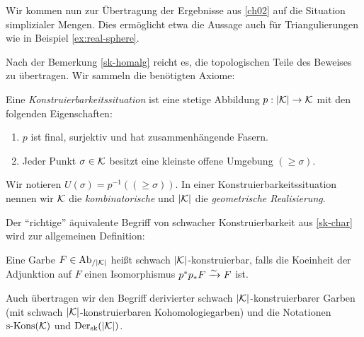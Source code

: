 Wir kommen nun zur Übertragung der Ergebnisse aus \ref{ch02} auf die
Situation simplizialer Mengen. Dies ermöglicht etwa die Aussage auch
für Triangulierungen wie in Beispiel \ref{ex:real-sphere}.

Nach der Bemerkung \ref{sk-homalg} reicht es, die topologischen Teile
des Beweises zu übertragen. Wir sammeln die benötigten Axiome:
\begin{defn} \label{def:constr}
  Eine \emph{Konstruierbarkeitssituation} ist eine stetige Abbildung
  $p: |\mathcal{K}| \to \mathcal{K}$ mit den folgenden Eigenschaften:
  \begin{enumerate}
  \item \label{constr-final} $p$ ist final, surjektiv und hat
    zusammenhängende Fasern.
  \item \label{constr-comb-space} Jeder Punkt $\sigma \in \mathcal{K}$ besitzt
    eine kleinste offene Umgebung $(\geq \sigma)$.
  \end{enumerate}
\end{defn}
Wir notieren $U(\sigma) = p^{-1}((\geq \sigma))$. In einer
Konstruierbarkeitssituation nennen wir $\mathcal{K}$ die \emph{kombinatorische}
und $|\mathcal{K}|$ die \emph{geometrische Realisierung}.

Der ``richtige'' äquivalente Begriff von schwacher Konstruierbarkeit
aus \ref{sk-char} wird zur allgemeinen Definition:
\begin{defn}
  Eine Garbe $F \in \operatorname{Ab}_{/|\mathcal{K}|}$ heißt schwach $|\mathcal{K}|$-konstruierbar, falls
  die Koeinheit der Adjunktion auf $F$ einen Isomorphismus $p^* p_* F
  \xrightarrow[]{\sim} F$ ist.
\end{defn}
Auch übertragen wir den Begriff derivierter schwach
$|\mathcal{K}|$-konstruierbarer Garben (mit schwach $|\mathcal{K}|$-konstruierbaren
Kohomologiegarben) und die Notationen $\operatorname{s-Kons}(\mathcal{K})$ und $\operatorname{Der}_{\mathrm{sk}}(|\mathcal{K}|)$.

